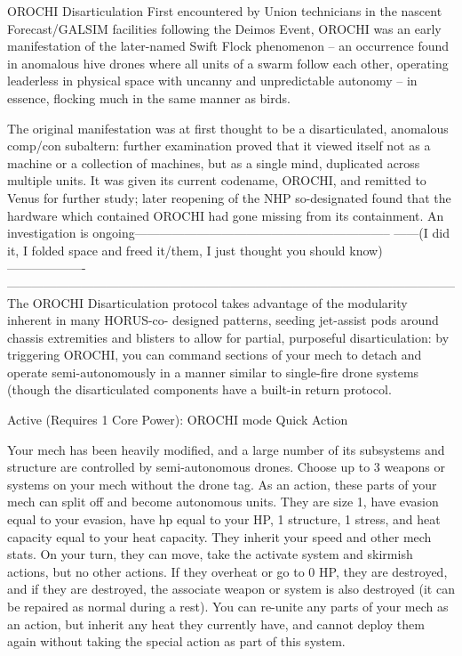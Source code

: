                                                                                                            


                                               OROCHI Disarticulation  
 First encountered by Union technicians in the nascent Forecast/GALSIM facilities following the Deimos  
 Event, OROCHI was an early manifestation of the later-named Swift Flock phenomenon -- an  
 occurrence found in anomalous hive drones where all units of a swarm follow each other, operating  
 leaderless in physical space with uncanny and unpredictable autonomy -- in essence, flocking much in  
  the same manner as birds.   

  The original manifestation was at first thought to be a disarticulated, anomalous comp/con subaltern:  
 further examination proved that it viewed itself not as a machine or a collection of machines, but as a  
 single mind, duplicated across multiple units. It was given its current codename, OROCHI, and remitted  
  to Venus for further study; later reopening of the NHP so-designated found that the hardware which  
 contained OROCHI had gone missing from its containment. An investigation is  
 ongoing--------------------------------------------------------------  
 ------(I did it, I folded space and freed it/them, I just thought you should know)-------------------     
 ------------------------------------------------------------------------------------------------------------  
  The OROCHI Disarticulation protocol takes advantage of the modularity inherent in many HORUS-co- 
 designed patterns, seeding jet-assist pods around chassis extremities and blisters to allow for partial,  
 purposeful disarticulation: by triggering OROCHI, you can command sections of your mech to detach  
 and operate semi-autonomously in a manner similar to single-fire drone systems (though the  
 disarticulated components have a built-in return protocol.    

 Active (Requires 1 Core Power): OROCHI mode  
  Quick Action
 
 Your mech has been heavily modified, and a large number of its subsystems and structure are  
  controlled by semi-autonomous drones. Choose up to 3 weapons or systems on your mech without the  
  drone tag. As an action, these parts of your mech can split off and become autonomous units. They are  
  size 1, have evasion equal to your evasion, have hp equal to your HP, 1 structure, 1 stress, and heat  
  capacity equal to your heat capacity. They inherit your speed and other mech stats. On your turn, they  
  can move, take the activate system and skirmish actions, but no other actions. If they overheat or go to  
  0 HP, they are destroyed, and if they are destroyed, the associate weapon or system is also destroyed  
  (it can be repaired as normal during a rest). You can re-unite any parts of your mech as an action, but  
  inherit any heat they currently have, and cannot deploy them again without taking the special action as  
  part of this system.  

